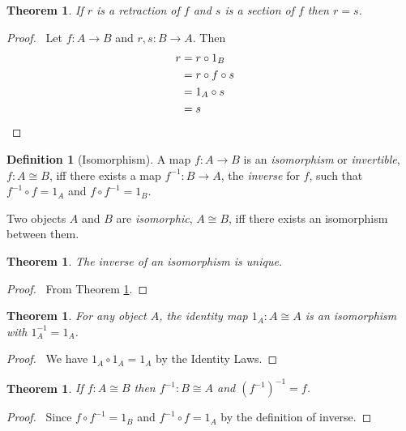 \documentclass{article}
\let\qed\relax
\newtheorem{thm}[axiom]{Theorem}
\theoremstyle{definition}
\newtheorem{definition}[axiom]{Definition}
\newcommand{\inv}[1]{\ensuremath{{#1}^{-1}}}
\begin{document}
\begin{thm}
    \label{thm:inverse_unique}
    If $r$ is a retraction of $f$ and $s$ is a section of $f$ then $r = s$.
\end{thm}

\begin{proof}
    \pf\ Let $f : A \rightarrow B$ and $r, s : B \rightarrow A$. Then
    \begin{align*}
        r & = r \circ 1_B \\
        & = r \circ f \circ s \\
        & = 1_A \circ s \\
        & = s & \qed
    \end{align*}
\end{proof}

\begin{definition}[Isomorphism]
    A map $f : A \rightarrow B$ is an \emph{isomorphism} or \emph{invertible}, $f : A \cong B$, iff there
    exists a map $f^{-1} : B \rightarrow A$, the \emph{inverse} for $f$, such that $f^{-1} \circ f = 1_A$ and
    $f \circ f^{-1} = 1_B$.
    
    Two objects $A$ and $B$ are \emph{isomorphic}, $A \cong B$, iff there exists an isomorphism between them.
\end{definition}

\begin{thm}
    The inverse of an isomorphism is unique.
\end{thm}

\begin{proof}
    \pf\ From Theorem \ref{thm:inverse_unique}. \qed
\end{proof}

\begin{thm}
    For any object $A$, the identity map $1_A : A \cong A$ is an isomorphism with $1_A^{-1} = 1_A$.
\end{thm}

\begin{proof}
    \pf\ We have $1_A \circ 1_A = 1_A$ by the Identity Laws. \qed
\end{proof}

\begin{thm}
    If $f : A \cong B$ then $\inv{f} : B \cong A$ and $\inv{(\inv{f})} = f$.
\end{thm}

\begin{proof}
    \pf\ Since $f \circ \inv{f} = 1_B$ and $\inv{f} \circ f = 1_A$ by the definition of inverse. \qed
\end{proof}
\end{document}
